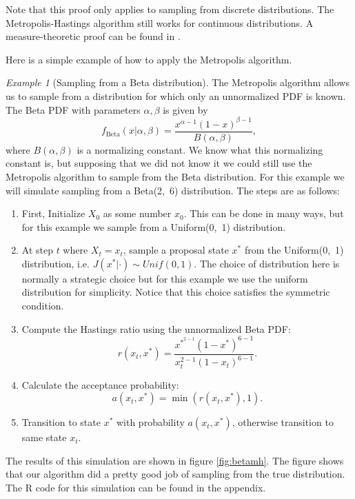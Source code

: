 \documentclass[11pt]{amsart}
\theoremstyle{theorem} %
\theoremstyle{definition}                  %
\theoremstyle{example}                       %
\theoremstyle{remark}                       %
\newtheorem{exmp}[thm]{Example}  %
\numberwithin{equation}{section}
\begin{document}
Note that this proof only applies to sampling from discrete distributions. The Metropolis-Hastings algorithm still works for continuous distributions. A measure-theoretic proof can be found in \cite{measure}.

\medskip

Here is a simple example of how to apply the Metropolis algorithm.

\begin{exmp}[Sampling from a Beta distribution]
\label{ex:betamh}
    The Metropolis algorithm allows us to sample from a distribution for which only an unnormalized PDF is known. The Beta PDF with parameters $\alpha, \beta$ is given by 
    \[f_{\text{Beta}}(x|\alpha, \beta) = \frac{x^{\alpha-1}(1-x)^{\beta -1}}{B(\alpha, \beta)},\]
    where $B(\alpha, \beta)$ is a normalizing constant. We know what this normalizing constant is, but supposing that we did not know it we could still use the Metropolis algorithm to sample from the Beta distribution. For this example we will simulate sampling from a Beta(2,~6) distribution. The steps are as follows:
    \begin{enumerate}
        \item First, Initialize $X_0$ as some number $x_0$. This can be done in many ways, but for this example we sample from a Uniform(0,~1) distribution. 
        \item At step $t$ where $X_t=x_t$, sample a proposal state $x^*$ from the Uniform(0,~1) distribution, i.e. $J(x^*|\cdot) \sim Unif (0,1)$. The choice of distribution here is normally a strategic choice but for this example we use the uniform distribution for simplicity. Notice that this choice satisfies the symmetric condition.
        \item Compute the Hastings ratio using the unnormalized Beta PDF:
        \[r(x_t,x^*)=\frac{x^{*^{2-1}}(1-x^*)^{6 -1}}{x_t^{2-1}(1-x_t)^{6 -1}}.\]
        \item Calculate the acceptance probability: \[a(x_t,x^*)=\min(r(x_t,x^*),1).\]
    \item Transition to state $x^*$ with probability $a(x_t,x^*)$, otherwise transition to same state $x_t$. 
    \end{enumerate}
    
    The results of this simulation are shown in figure \ref{fig:betamh}. The figure shows that our algorithm did a pretty good job of sampling from the true distribution. The R code for this simulation can be found in the appendix.
    
    \begin{figure}
    

\end{figure}
\end{exmp}
\end{document}
